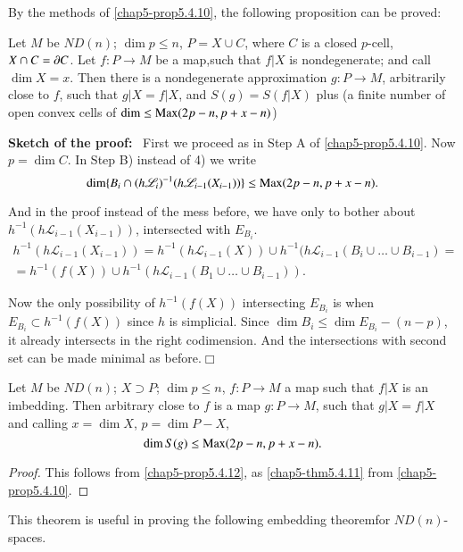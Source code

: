By the methods of \ref{chap5-prop5.4.10}, the following proposition can be proved:

\begin{proposition}\label{chap5-prop5.4.12}
Let $M$ be $ND(n)$; $\dim p\leq n$, $P=X\cup C$, where $C$ is a closed $p$-cell, $X\cap C=\partial C$. Let $f:P\to M$ be a map,\pageoriginale such that $f|X$ is nondegenerate; and call $\dim X=x$. Then there is a nondegenerate approximation $g:P\to M$, arbitrarily close to $f$, such that $g|X=f|X$, and $S(g)=S(f|X)$ plus (a finite number of open convex cells of $\dim \leq \operatorname{Max} (2p-n,p+x-n)$)
\end{proposition}

\noindent
{\bf Sketch of the proof:}~ First we proceed as in Step A of \ref{chap5-prop5.4.10}. Now $p=\dim C$. In Step B) instead of 4) we write
$$
\dim\{B_{i}\cap (h\mathscr{L}_{i})^{-1}(h\mathscr{L}_{i-1}(X_{i-1}))\} \leq \operatorname{Max} (2p-n,p+x-n).  
$$

And in the proof instead of the mess before, we have only to bother about $h^{-1}(h\mathscr{L}_{i-1}(X_{i-1}))$, intersected with $E_{B_{i}}$.
\begin{gather*}
h^{-1}(h\mathscr{L}_{i-1}(X_{i-1}))=h^{-1}(h\mathscr{L}_{i-1}(X))\cup h^{-1}(h\mathscr{L}_{i-1}(B_{i}\cup\ldots\cup B_{i-1})=\\
=h^{-1}(f(X))\cup h^{-1}(h\mathscr{L}_{i-1}(B_{1}\cup\ldots\cup B_{i-1})).
\end{gather*}

Now the only possibility of $h^{-1}(f(X))$ intersecting $E_{B_{i}}$ is when $E_{B_{i}}\subset h^{-1}(f(X))$ since $h$ is simplicial. Since $\dim B_{i}\leq \dim E_{B_{i}}-(n-p)$, it already intersects in the right codimension. And the intersections with second set can be made minimal as before.\hfill$\Box$

\begin{theorem}\label{chap5-thm5.4.13}
Let $M$ be $ND(n)$; $X\supset P$; $\dim p\leq n$, $f:P\to M$ a map such that $f|X$ is an imbedding. Then arbitrary close to $f$ is a map $g:P\to M$, such that $g|X=f|X$ and calling $x=\dim X$, $p=\dim P-X$,
$$
\dim S(g)\leq \operatorname{Max}(2p-n,p+x-n).
$$
\end{theorem}

\begin{proof}
This follows from \ref{chap5-prop5.4.12}, as \ref{chap5-thm5.4.11} from \ref{chap5-prop5.4.10}. 
\end{proof}

This theorem is useful in proving the following embedding theorem\pageoriginale for $ND(n)$-spaces.

